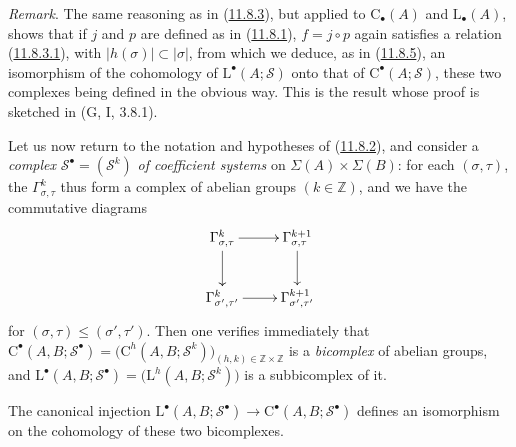 \begin{env}[11.8.7]
\label{0.11.8.7}
\emph{Remark}. The same reasoning as in
(\hyperref[0.11.8.3]{11.8.3}), but applied to
$\mathrm C_\bullet(A)$ and $\mathrm L_\bullet(A)$, shows that if $j$ and $p$
are defined as in (\hyperref[0.11.8.1]{11.8.1}), $f=j\circ p$
again satisfies a relation (\hyperref[0.11.8.3.1]{11.8.3.1}), with
$|h(\sigma)|\subset|\sigma|$, from which we deduce, as in
(\hyperref[0.11.8.5]{11.8.5}), an isomorphism of the cohomology of
$\mathrm L^\bullet(A;\mathscr S)$ onto that of
$\mathrm C^\bullet(A;\mathscr S)$, these two complexes being defined in the
obvious way. This is the result whose proof is sketched in
(G, I, 3.8.1).
\end{env}

\begin{env}[11.8.8]
\label{0.11.8.8}
Let us now return to the notation and hypotheses of
(\hyperref[0.11.8.2]{11.8.2}), and consider a \emph{complex}
$\mathscr S^\bullet=(\mathscr S^k)$ \emph{of coefficient systems} on
$\Sigma(A)\times\Sigma(B)$: for each $(\sigma,\tau)$, the
$\Gamma^k_{\sigma,\tau}$ thus form a complex of abelian groups
$(k\in\mathbb Z)$, and we have the commutative diagrams
\[
\xymatrix{
\Gamma^k_{\sigma,\tau}\ar[r]\ar[d] &
\Gamma^{k+1}_{\sigma,\tau}\ar[d]\\
\Gamma^k_{\sigma',\tau'}\ar[r] &
\Gamma^{k+1}_{\sigma',\tau'}
}
\]
for $(\sigma,\tau)\leq(\sigma',\tau')$. Then one verifies immediately that $\mathrm C^\bullet(A,B;\mathscr S^\bullet)
=\bigl(\mathrm C^h(A,B;\mathscr S^k)\bigr)_{(h,k)\in\mathbb Z\times\mathbb Z}$
is a \emph{bicomplex} of abelian groups, and $\mathrm L^\bullet(A,B;\mathscr S^\bullet)
=\bigl(\mathrm L^h(A,B;\mathscr S^k)\bigr)$
is a subbicomplex of it.
\end{env}

\begin{proposition}[11.8.9]
\label{0.11.8.9}
The canonical injection $\mathrm L^\bullet(A,B;\mathscr S^\bullet)\longrightarrow
\mathrm C^\bullet(A,B;\mathscr S^\bullet)$
defines an isomorphism on the cohomology of these two bicomplexes.
\end{proposition}

